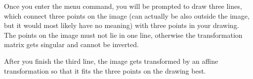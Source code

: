 Once you enter the menu command, you will be prompted to draw three lines, which connect
three points on the image (can actually be also outside the image, but it would most
likely have no meaning) with three points in your drawing. The points on the image
must not lie in one line, otherwise the transformation matrix gets singular and cannot
be inverted.

After you finish the third line, the image gets transformed by an affine transformation
so that it fits the three points on the drawing best.

